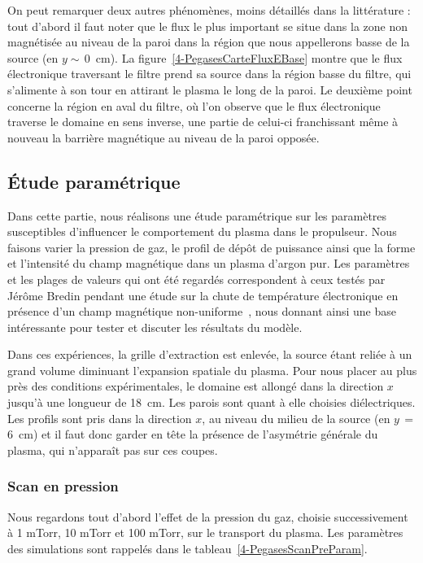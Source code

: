 \begin{refsection}
On peut remarquer
deux autres phénomènes, moins détaillés dans la littérature : tout d'abord il
faut noter que le flux le plus important se situe dans la zone non magnétisée au
niveau de la paroi dans la région que nous appellerons basse de la source (en
$y\sim\,$0~cm).
La figure~\ref{4-PegasesCarteFluxEBase} montre que le flux électronique
traversant le filtre prend sa source dans la région basse du filtre, qui
s'alimente à son tour en attirant le plasma le long de la paroi.
Le deuxième point concerne la région en aval du filtre, où l'on observe que le
flux électronique traverse le domaine en sens inverse, une partie de celui-ci franchissant même à nouveau
la barrière magnétique au niveau de la paroi opposée.

\subsection{Étude paramétrique}
Dans cette partie, nous
réalisons une étude paramétrique sur les paramètres susceptibles
d'influencer le comportement du plasma dans le propulseur. Nous faisons varier
la pression de gaz, le profil de dépôt de puissance ainsi que la forme et
l'intensité du champ magnétique dans un plasma d'argon pur. Les paramètres et
les plages de valeurs qui ont été regardés correspondent à ceux testés par Jérôme Bredin pendant une étude sur la
chute de température électronique en présence d'un champ magnétique
non-uniforme~\parencite{Bredin}, nous donnant ainsi une base intéressante pour
tester et discuter les résultats du modèle.

Dans ces expériences, la grille d'extraction est
enlevée, la source étant reliée à un grand volume diminuant l'expansion spatiale du plasma. Pour nous
placer au plus près des conditions expérimentales, le domaine est allongé dans
la direction $x$ jusqu'à une longueur de 18~cm. Les parois sont quant à elle
choisies diélectriques. Les profils sont pris dans la direction $x$, au niveau
du milieu de la source (en $y\,=$ 6~cm) et il faut donc garder en tête la
présence de l'asymétrie générale du plasma, qui n'apparaît pas sur ces coupes.
	
\subsubsection{Scan en pression}

Nous regardons tout d'abord l'effet de la pression du gaz, choisie
successivement à 1 mTorr, 10 mTorr et 100 mTorr, sur le transport du plasma.
Les paramètres des simulations sont rappelés dans le
	tableau~\ref{4-PegasesScanPreParam}.
	

\end{refsection}
